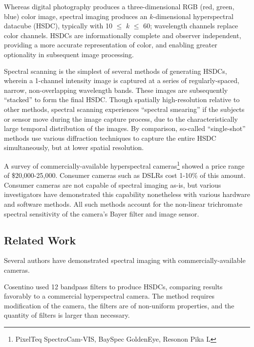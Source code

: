 \documentclass[twocolumn,10pt]{asme2ej}
\newcommand{\id}{\hspace{6 mm}}
\begin{document}

\id Whereas digital photography produces a three-dimensional RGB (red, green, blue) color image, spectral imaging produces an $k$-dimensional hyperspectral datacube (HSDC), typically with 10 $\leq$ $k$ $\leq$ 60; wavelength channels replace color channels. HSDCs are informationally complete and observer independent, providing a more accurate representation of color, and enabling greater optionality in subsequent image processing.


\id Spectral scanning is the simplest of several methods of generating HSDCs, wherein a 1-channel intensity image is captured at a series of regularly-spaced, narrow, non-overlapping wavelength bands. These images are subsequently ``stacked'' to form the final HSDC. Though spatially high-resolution relative to other methods, spectral scanning experiences ``spectral smearing'' if the subjects or sensor move during the image capture process, due to the characteristically large temporal distribution of the images. By comparison, so-called ``single-shot'' methods use various diffraction techniques to capture the entire HSDC simultaneously, but at lower spatial resolution.


\id A survey of commercially-available hyperspectral cameras\footnote{PixelTeq SpectroCam-VIS, BaySpec GoldenEye, Resonon Pika L} showed a price range of \$20,000-25,000. Consumer cameras such as DSLRs cost 1-10\% of this amount. Consumer cameras are not capable of spectral imaging as-is, but various investigators have demonstrated this capability nonetheless with various hardware and software methods. All such methods account for the non-linear trichromate spectral sensitivity of the camera's Bayer filter and image sensor.

\subsection{Related Work}

Several authors have demonstrated spectral imaging with commercially-available cameras.

\id Cosentino \cite{Cosentino} used 12 bandpass filters to produce HSDCs, comparing results favorably to a commercial hyperspectral camera. The method requires modification of the camera, the filters are of non-uniform properties, and the quantity of filters is larger than necessary.
\end{document}
